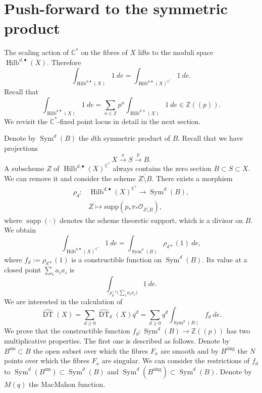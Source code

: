 \documentclass{amsart}
\theoremstyle{definition}
\newcommand{\CC} {\mathbb{C}}          %
\newcommand{\ZZ} {\mathbb{Z}}		%
\renewcommand{\O}{\mathcal{O}}
\newcommand{\Sym}{\operatorname{Sym}}
\newcommand{\Hilb}{\operatorname{Hilb}}
\newcommand{\DT}{\operatorname{DT}}
\newcommand{\supp}{\operatorname{supp}}
\newcommand{\sm}{\operatorname{sm}}
\newcommand{\sing}{\operatorname{sing}}
\begin{document}
\section{Push-forward to the symmetric product} \label{sym}

The scaling action of $\CC^*$ on the fibres of $X$ lifts to the moduli space $\Hilb^{d,\bullet}(X)$. Therefore
$$
\int_{\Hilb^{d,\bullet}(X)} 1 \ de = \int_{\Hilb^{d,\bullet}(X)^{\CC^*}} 1 \ de.
$$
Recall that 
$$
\int_{\Hilb^{d,\bullet}(X)} 1 \ de = \sum_{n \in \ZZ} p^n \int_{\Hilb^{d,n}(X)} 1 \ de \in \ZZ(\!(p)\!).
$$
We revisit the $\CC^*$-fixed point locus in detail in the next section. 

Denote by $\Sym^d(B)$ the $d$th symmetric product of $B$. Recall that we have projections 
$$
X \stackrel{\pi}{\longrightarrow} S \stackrel{p}{\longrightarrow} B.
$$
A subscheme $Z$ of $ \Hilb^{d,\bullet}(X)^{\CC^*}$ always contains the zero section $B \subset S \subset X$. We can remove it and consider the scheme $\overline{Z \setminus B}$. There exists a morphism
\begin{align*}
\rho_{d} : &\Hilb^{d,\bullet}(X)^{\CC^*} \longrightarrow \Sym^d(B), \\
&Z \mapsto \mathrm{supp}( p_* \pi_* \O_{\overline{Z \setminus B}} ),
\end{align*}
where $\supp(\cdot)$ denotes the scheme theoretic support, which is a divisor on $B$. 
We obtain
$$
\int_{\Hilb^{d,\bullet}(X)^{\CC^*}} 1 \ de = \int_{\Sym^d(B)} \rho_{d*}(1) \ de,
$$
where $f_d := \rho_{d*}(1)$ is a constructible function on $\Sym^d(B)$. Its value at a closed point $\sum_i a_i x_i$ is 
$$
\int_{\rho_{d}^{-1}\big(\sum_i a_i x_i\big)} 1 \ de.
$$
We are interested in the calculation of
$$
\widehat{\DT}(X) = \sum_{d \geq 0} \widehat{\DT}_d(X) q^d =\sum_{d \geq 0} q^d \int_{\Sym^d(B)} f_d \ de.
$$
We prove that the constructible function $f_d : \Sym^d(B) \rightarrow \ZZ(\!(p)\!)$ has two multiplicative properties. The first one is described as follows. Denote by $B^{\sm} \subset B$ the open subset over which the fibres $F_x$ are smooth and by $B^{\sing}$ the $N$ points over which the fibres $F_x$ are singular. We can consider the restrictions of $f_d$ to $\Sym^d(B^{\sm}) \subset \Sym^d(B)$ and $\Sym^d(B^{\sing}) \subset \Sym^d(B)$. Denote by $M(q)$ the MacMahon function.
\end{document}
